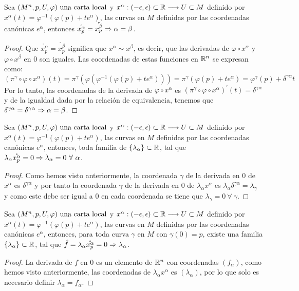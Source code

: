 \begin{proposition}
  Sea $(M^n,p,U,\varphi)\textmd{ una carta local}$ y $
  x^\alpha:(-\epsilon, \epsilon)
  \subset\mathbb{R}\longrightarrow U\subset M$ definido por $x^\alpha(t)=\varphi^{-1}(\varphi(p)+te^\alpha)$, las
  curvas en
  $M$
  definidas por las coordenadas canónicas $e^\alpha$, entonces
  $\mathring{x_p^\alpha}=\mathring{x_p^\beta}\Rightarrow\alpha=\beta$.
\end{proposition}
\begin{proof}
  Que $\mathring{x_p^\alpha}=\mathring{x_p^\beta}$ significa que
  $x^\alpha\sim x^\beta$, es decir, que las derivadas de
  $\varphi\circ x^\alpha$ y $\varphi\circ x^\beta$ en 0 son iguales.
  Las coordenadas de estas funciones en $\mathbb{R}^n$ se expresan como:
  \begin{equation*}
    (\pi^\gamma\circ\varphi\circ x^\alpha)(t)=\pi^\gamma(\varphi(\varphi^{-1}(\varphi(p)
    +te^\alpha)))=\pi^\gamma(\varphi(p)
    +te^\alpha)=\varphi^\gamma(p)+\delta^{\gamma\alpha} t
  \end{equation*}
  Por lo tanto, las coordenadas de la derivada de $\varphi\circ x^\alpha$ es
  $(\pi^\gamma\circ\varphi\circ x^\alpha)^\prime(t)=\delta^{\gamma\alpha}$ y de la igualdad dada
  por la relación de equivalencia, tenemos que
  $\delta^{\gamma\alpha}=\delta^{\gamma\alpha}\Rightarrow\alpha=\beta$.
\end{proof}

\begin{proposition}
  Sea $(M^n,p,U,\varphi)\textmd{ una carta local}$ y $
  x^\alpha:(-\epsilon, \epsilon)
  \subset\mathbb{R}\longrightarrow U\subset M$ definido por $x^\alpha(t)=\varphi^{-1}(\varphi(p)+te^\alpha)$, las curvas en
  $M$
  definidas por las coordenadas canónicas $e^\alpha$, entonces, toda familia de
  $\{\lambda_\alpha\}\subset\mathbb{R}$, tal que
  $\lambda_\alpha\mathring{x_p^\alpha}=0\so\lambda_\alpha=0\ \forall\ \alpha$.
\end{proposition}
\begin{proof}
  Como hemos visto anteriormente, la coordenada $\gamma$ de la derivada en $0$ de $x^\alpha$ es
  $\delta^{\gamma\alpha}$ y por tanto la coordenada $\gamma$ de la derivada en $0$ de
  $\lambda_\alpha x^\alpha$ es $\lambda_\alpha\delta^{\gamma\alpha}=\lambda_\gamma$ y como este
  debe ser igual a $0$ en cada coordenada se tiene que $\lambda_\gamma=0\ \forall\ \gamma$.
\end{proof}

\begin{proposition}
  Sea $(M^n,p,U,\varphi)\textmd{ una carta local}$ y $
  x^\alpha:(-\epsilon, \epsilon)
  \subset\mathbb{R}\longrightarrow U\subset M$ definido por $x^\alpha(t)=\varphi^{-1}(\varphi(p)+te^\alpha)$, las curvas en
  $M$
  definidas por las coordenadas canónicas $e^\alpha$, entonces, para toda curva $\gamma$ en $M$ con
  $\gamma(0)=p$, existe una familia
  $\{\lambda_\alpha\}\subset\mathbb{R}$, tal que
  $\mathring{f}=\lambda_\alpha\mathring{x_p^\alpha}=0\Rightarrow\lambda_\alpha$.
\end{proposition}
\begin{proof}
  La derivada de $f$ en $0$ es un elemento de $\mathbb{R}^n$ con coordenadas $(f_\alpha)$, como hemos visto
  anteriormente, las coordenadas de $\lambda_\alpha x^\alpha$ es $(\lambda_\alpha)$, por lo que
  solo es necesario definir $\lambda_\alpha=f_\alpha$.
\end{proof}

